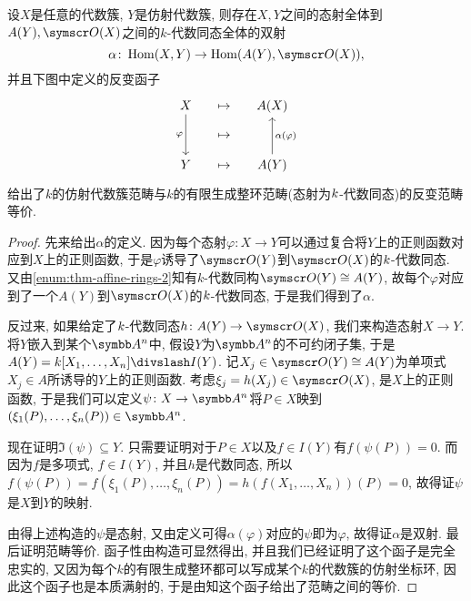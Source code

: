 \begin{theorem}\label{thm:categoryisoaffinevariety}
  设$X$是任意的代数簇, $Y$是仿射代数簇, 则存在$X, Y$之间的态射全体到$A(Y),\linebreak[0] \OO (X)$之间的$k$-代数同态全体的双射
  \begin{equation*}
    \alpha\colon \Hom (X, Y)\to\Hom (A(Y), \OO (X)),
  \end{equation*}
  并且下图中定义的反变函子
  \begin{equation*}
    \begin{tikzcd}[sep=small]
      X \arrow[dd, "\varphi"'] & \mapsto & A(X)\\
      & \mapsto & \\
      Y & \mapsto & A(Y) \arrow[uu, "\alpha (\varphi)"']
    \end{tikzcd}
  \end{equation*}
  给出了$k$的仿射代数簇范畴与$k$的有限生成整环范畴(态射为$k$-代数同态)的反变范畴等价.
\end{theorem}

\begin{proof}
  先来给出$\alpha$的定义. 因为每个态射$\varphi\colon X\to Y$可以通过复合将$Y$上的正则函数对应到$X$上的正则函数, 于是$\varphi$诱导了$\OO (Y)$到$\OO (X)$的$k$-代数同态. 又由\ref{enum:thm-affine-rings-2}知有$k$-代数同构$\OO (Y)\cong A(Y)$, 故每个$\varphi$对应到了一个$A(Y)$到$\OO (X)$的$k$-代数同态, 于是我们得到了$\alpha$.

  反过来, 如果给定了$k$-代数同态$h\colon A(Y)\to \OO (X)$, 我们来构造态射$X\to Y$. 将$Y$嵌入到某个$\AF^n$中, 假设$Y$为$\AF^n$的不可约闭子集, 于是$A(Y)=\kk [X_1, \dotsc, X_n]{\divslash} I(Y)$. 记$X_j\in \OO (Y)\cong A(Y)$为单项式$X_j\in A$所诱导的$Y$上的正则函数. 考虑$\xi_j=h(X_j)\in \OO (X)$, 是$X$上的正则函数, 于是我们可以定义$\psi\colon X\to \AF^n$将$P\in X$映到$(\xi_1 (P), \dotsc, \xi_n (P))\in \AF^n$.

  现在证明$\Im (\psi)\subseteq Y$. 只需要证明对于$P\in X$以及$f\in I(Y)$有$f(\psi(P))=0$. 而因为$f$是多项式, $f\in I(Y)$, 并且$h$是代数同态, 所以$f(\psi(P))=f(\xi_1(P), \dotsc, \xi_n(P))=h(f(X_1, \dotsc, X_n))(P)=0$, 故得证$\psi$是$X$到$Y$的映射.

  由得上述构造的$\psi$是态射, 又由定义可得$\alpha(\varphi)$对应的$\psi$即为$\varphi$, 故得证$\alpha$是双射. 最后证明范畴等价. 函子性由构造可显然得出, 并且我们已经证明了这个函子是完全忠实的, 又因为每个$k$的有限生成整环都可以写成某个$k$的代数簇的仿射坐标环, 因此这个函子也是本质满射的, 于是由知这个函子给出了范畴之间的等价.
\end{proof}

